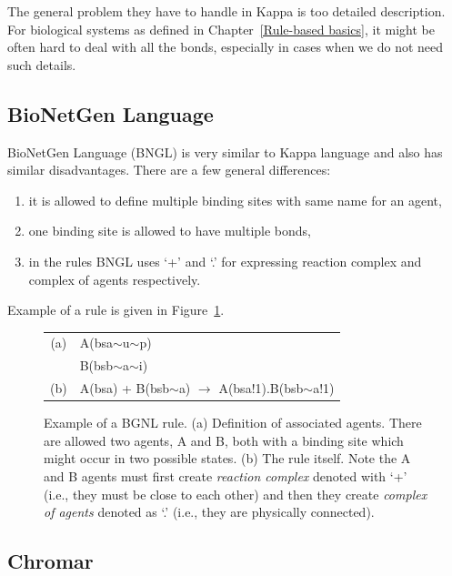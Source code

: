 \documentclass[12pt]{fithesis2}
\begin{document}
The general problem they have to handle in Kappa is too detailed description. For biological systems as defined in Chapter~\ref{Rule-based basics}, it might be often hard to deal with all the bonds, especially in cases when we do not need such details.

\subsection{BioNetGen Language}
\label{bngl}

BioNetGen Language (BNGL) \cite{BNGL} is very similar to Kappa language and also has similar disadvantages. There are a few general differences: 

\begin{enumerate}
	\item it is allowed to define multiple binding sites with same name for an agent,
	\item one binding site is allowed to have multiple bonds,
	\item in the rules BNGL uses `+' and `.' for expressing reaction complex and complex of agents respectively.
\end{enumerate}

Example of a rule is given in Figure~\ref{bngl-rule}.

\begin{figure}[!h]
\begin{center}
\begin{tabular}{c l}
(a) & A(bsa$\sim$u$\sim$p) \\
  & B(bsb$\sim$a$\sim$i) \\
(b) & A(bsa) + B(bsb$\sim$a) $\rightarrow$ A(bsa!1).B(bsb$\sim$a!1) \\
\end{tabular}
\end{center}
\caption{Example of a BGNL rule. (a) Definition of associated agents. There are allowed two agents, A and B, both with a binding site which might occur in two possible states. (b) The rule itself. Note the A and B agents must first create \emph{reaction complex} denoted with `+' (i.e., they must be close to each other) and then they create \emph{complex of agents} denoted as `.' (i.e., they are physically connected).}\label{bngl-rule}
\end{figure}

\subsection{Chromar}
\end{document}
